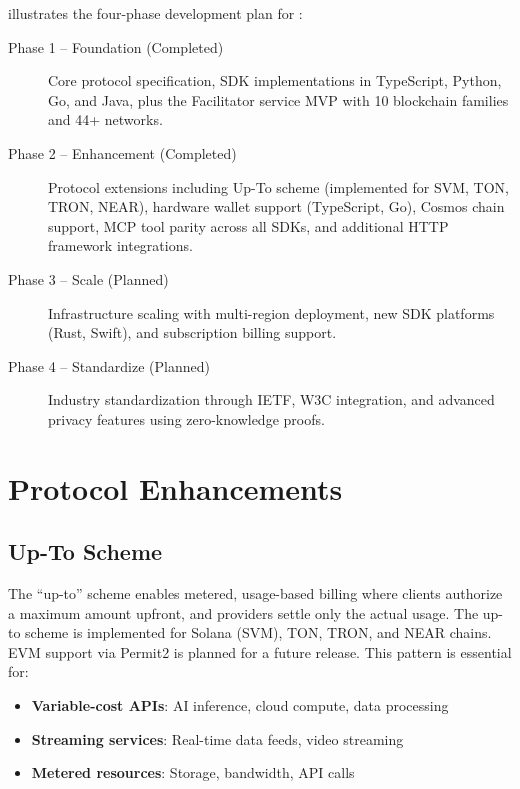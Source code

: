  illustrates the four-phase development plan for \tprotocol{}:

\begin{description}
    \item[Phase 1 -- Foundation (Completed)] Core protocol specification, SDK implementations in TypeScript, Python, Go, and Java, plus the Facilitator service MVP with 10 blockchain families and 44+ networks.

    \item[Phase 2 -- Enhancement (Completed)] Protocol extensions including Up-To scheme (implemented for SVM, TON, TRON, NEAR), hardware wallet support (TypeScript, Go), Cosmos chain support, MCP tool parity across all SDKs, and additional HTTP framework integrations.

    \item[Phase 3 -- Scale (Planned)] Infrastructure scaling with multi-region deployment, new SDK platforms (Rust, Swift), and subscription billing support.

    \item[Phase 4 -- Standardize (Planned)] Industry standardization through IETF, W3C integration, and advanced privacy features using zero-knowledge proofs.
\end{description}

\section{Protocol Enhancements}
\label{sec:protocol-enhancements}

\subsection{Up-To Scheme}
\label{subsec:up-to-scheme}

The ``up-to'' scheme enables metered, usage-based billing where clients authorize a maximum amount upfront, and providers settle only the actual usage. The up-to scheme is implemented for Solana (SVM), TON, TRON, and NEAR chains. EVM support via Permit2 is planned for a future release. This pattern is essential for:

\begin{itemize}
    \item \textbf{Variable-cost APIs}: AI inference, cloud compute, data processing
    \item \textbf{Streaming services}: Real-time data feeds, video streaming
    \item \textbf{Metered resources}: Storage, bandwidth, API calls
\end{itemize}

